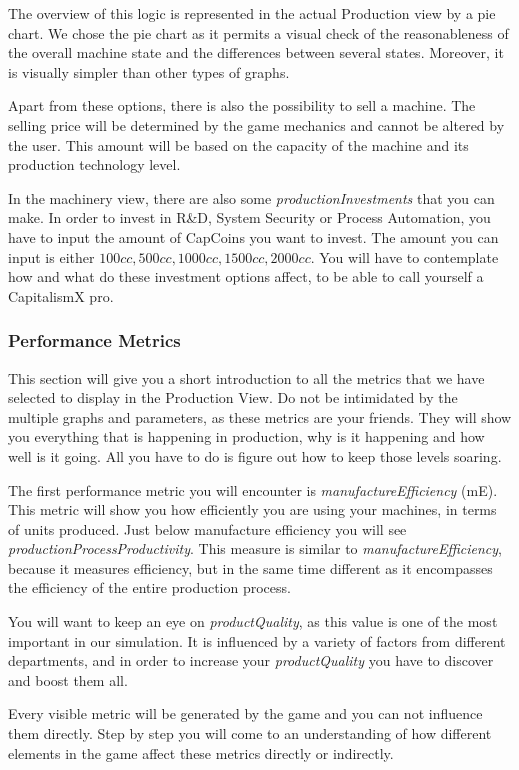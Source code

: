 The overview of this logic is represented in the actual Production view by a pie chart. We chose the pie chart as it permits a visual check of the reasonableness of the overall machine state and the differences between several states. Moreover, it is visually simpler than other types of graphs.
 
Apart from these options, there is also the possibility to sell a machine. The selling price will be determined by the game mechanics and cannot be altered by the user. This amount will be based on the capacity of the machine and its production technology level.

In the machinery view, there are also some \textit{productionInvestments} that you can make. In order to invest in R\&D, System Security or Process Automation, you have to input the amount of CapCoins you want to invest. The amount you can input is either $100cc,500cc,1000cc,1500cc,2000cc$. You will have to contemplate how and what do these investment options affect, to be able to call yourself a CapitalismX pro.

\subsubsection{Performance Metrics}
This section will give you a short introduction to all the metrics that we have selected to display in the Production View. Do not be intimidated by the multiple graphs and parameters, as these metrics are your friends. They will show you everything that is happening in production, why is it happening and how well is it going. All you have to do is figure out how to keep those levels soaring. 

The first performance metric you will encounter is \textit{manufactureEfficiency} (\gls{mE}). This metric will show you how efficiently you are using your machines, in terms of units produced.
Just below manufacture efficiency you will see \textit{productionProcessProductivity}. This measure is similar to \textit{manufactureEfficiency}, because it measures efficiency, but in the same time different as it encompasses the efficiency of the entire production process. 

You will want to keep an eye on \textit{productQuality}, as this value is one of the most important in our simulation. It is influenced by a variety of factors from different departments, and in order to increase your \textit{productQuality} you have to discover and  boost them all.

Every visible metric will be generated by the game and you can not influence them directly. Step by step you will come to an understanding of how different elements in the game affect these metrics directly or indirectly.

